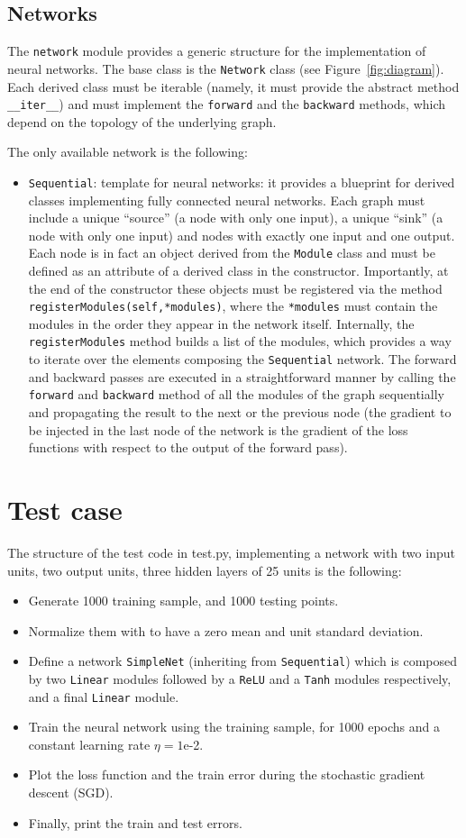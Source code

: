 \documentclass[10pt,final,a4paper]{article}
\begin{document}
\subsection{Networks}
The \verb|network| module provides a generic structure for the implementation of neural networks. The base class is the \verb|Network| class (see Figure~\ref{fig:diagram}). Each derived class must be iterable (namely, it must provide the abstract method \verb|__iter__|) and must implement the \verb|forward| and the \verb|backward| methods, which depend on the topology of the underlying graph.

The only available network is the following:
\begin{itemize}
\item \verb|Sequential|: template for neural networks: it provides a blueprint for derived classes implementing fully connected neural networks. Each graph must include a unique ``source'' (a node with only one input), a unique ``sink'' (a node with only one input) and nodes with exactly one input and one output. Each node is in fact an object derived from the \verb|Module| class and must be defined as an attribute of a derived class in the constructor. Importantly, at the end of the constructor these objects must be registered via the method \verb|registerModules(self,*modules)|, where the \verb|*modules| must contain the modules in the order they appear in the network itself. Internally, the \verb|registerModules| method builds a list of the modules, which  provides a way to iterate over the elements composing the \verb|Sequential| network. The forward and backward passes are executed in a straightforward manner by calling the \verb|forward| and \verb|backward| method of all the modules of the graph sequentially and propagating the result to the next or the previous node (the gradient to be injected in the last node of the network is the gradient of the loss functions with respect to the output of the forward pass).
\end{itemize}
\section{Test case}
The structure of the test code in test.py, implementing a network with two input units, two output units, three hidden layers of 25 units is the following:
\begin{itemize}
\item Generate 1000 training sample, and 1000 testing points.
\item Normalize them with to have a zero mean and unit standard deviation.
\item Define a network \verb|SimpleNet| (inheriting from \verb|Sequential|) which is composed by two \verb|Linear| modules followed by a \verb|ReLU| and a \verb|Tanh| modules respectively, and a final \verb|Linear| module.
\item Train the neural network using the training sample, for 1000 epochs and a constant learning rate $\eta =1$e-2.
\item Plot the loss function and the train error during the stochastic gradient descent (SGD).
\item Finally, print the train and test errors.
\end{itemize}
\end{document}
